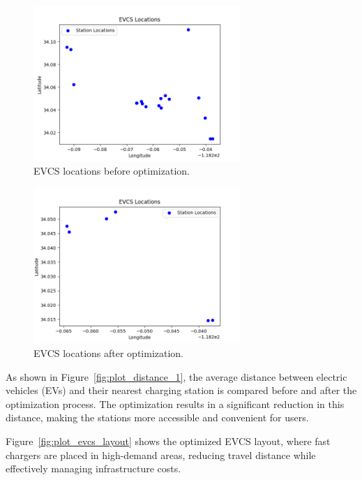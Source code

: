 \begin{figure}[h!]
\centering
\includegraphics[width=0.7\textwidth]{../Figures/original_map.png}
\caption{EVCS locations before optimization.}
\label{fig:location_before}
\end{figure}

\begin{figure}[h!]
\centering
\includegraphics[width=0.7\textwidth]{../Figures/optimized_map.png}
\caption{EVCS locations after optimization.}
\label{fig:location_after}
\end{figure}

\newpage

As shown in Figure~\ref{fig:plot_distance_1}, the average distance between electric vehicles (EVs) and their nearest charging station is compared before and after the optimization process. The optimization results in a significant reduction in this distance, making the stations more accessible and convenient for users. 

Figure~\ref{fig:plot_evcs_layout} shows the optimized EVCS layout, where fast chargers are placed in high-demand areas, reducing travel distance while effectively managing infrastructure costs.

